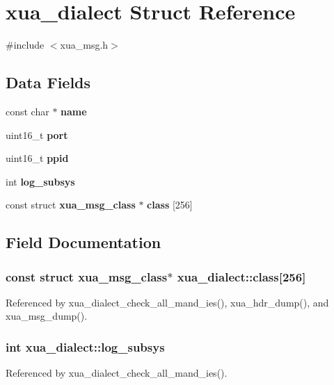 \section{xua\+\_\+dialect Struct Reference}
\label{structxua__dialect}


{\ttfamily \#include $<$xua\+\_\+msg.\+h$>$}

\subsection*{Data Fields}
\begin{DoxyCompactItemize}
\item 
const char $\ast$ {\bf name}
\item 
uint16\+\_\+t {\bf port}
\item 
uint16\+\_\+t {\bf ppid}
\item 
int {\bf log\+\_\+subsys}
\item 
const struct {\bf xua\+\_\+msg\+\_\+class} $\ast$ {\bf class} [256]
\end{DoxyCompactItemize}


\subsection{Field Documentation}
\subsubsection[{class}]{\setlength{\rightskip}{0pt plus 5cm}const struct {\bf xua\+\_\+msg\+\_\+class}$\ast$ xua\+\_\+dialect\+::class[256]}\label{structxua__dialect_a2a67f63f988c2ddd8a28ccc889ff12db}


Referenced by xua\+\_\+dialect\+\_\+check\+\_\+all\+\_\+mand\+\_\+ies(), xua\+\_\+hdr\+\_\+dump(), and xua\+\_\+msg\+\_\+dump().

\subsubsection[{log\+\_\+subsys}]{\setlength{\rightskip}{0pt plus 5cm}int xua\+\_\+dialect\+::log\+\_\+subsys}\label{structxua__dialect_a6908c416b93e64f072a8262b9f56b460}


Referenced by xua\+\_\+dialect\+\_\+check\+\_\+all\+\_\+mand\+\_\+ies().

